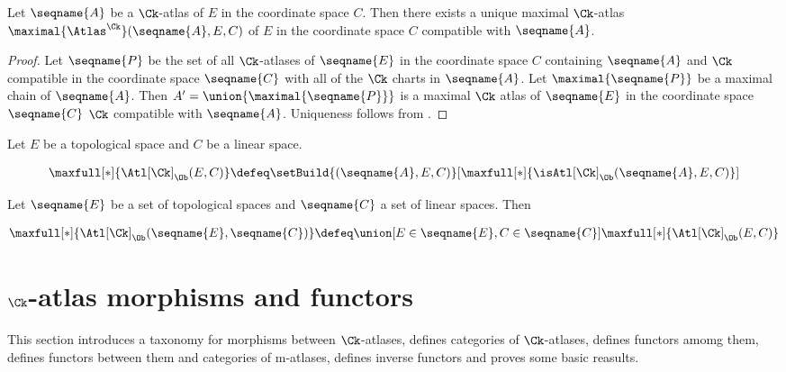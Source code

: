 \documentclass{article}
\begin{document}
\begin{theorem}
Let $\seqname{A}$ be a $\Ck$-atlas of $E$ in the coordinate space $C$.
Then there exists a unique maximal $\Ck$-atlas
$\maximal{\Atlas^\Ck}(\seqname{A}, E, C)$ of $E$ in the coordinate space $C$
compatible with $\seqname{A}$.

\begin{proof}
Let $\seqname{P}$ be the set of all $\Ck$-atlases of $\seqname{E}$ in
the coordinate space $C$ containing $\seqname{A}$ and $\Ck$ compatible
in the coordinate space $\seqname{C}$ with all of the $\Ck$ charts in
$\seqname{A}$. Let $\maximal{\seqname{P}}$ be a maximal chain of
$\seqname{A}$. Then $A'=\union{\maximal{\seqname{P}}}$ is a maximal
$\Ck$ atlas of $\seqname{E}$ in the coordinate space $\seqname{C}$
$\Ck$ compatible with $\seqname{A}$.
Uniqueness follows from .
\end{proof}
\end{theorem}

\begin{definition}
\label{def:Ck-ATLsets}

Let $E$ be a topological space and $C$ be a linear space.

\begin{multline}
\maxfull[*]{\Atl[\Ck]_\Ob(E, C)} \defeq
\setBuild
{{
   (\seqname{A}, E, C)
}}%
[
  {
    \maxfull[*]
    {
      \isAtl[\Ck]_\Ob
      (\seqname{A}, E, C)
    }
  }
]
\end{multline}

Let $\seqname{E}$ be a set of topological spaces and $\seqname{C}$ a
set of linear spaces. Then

\begin{multline}
\maxfull[*]{\Atl[\Ck]_\Ob (\seqname{E}, \seqname{C})} \defeq
  \union
    [
        {E \in \seqname{E}},
        {C \in \seqname{C}}
    ]
    {{
      \maxfull[*]{\Atl[\Ck]_\Ob(E, C)}
    }}
\end{multline}

\end{definition}

\section{$\Ck$-atlas morphisms and functors}
\label{sec:ckmorph}
This section introduces a taxonomy for morphisms between $\Ck$-atlases,
defines categories of $\Ck$-atlases, defines functors amomg them,
defines functors between them and categories of m-atlases, defines
inverse functors and proves some basic reasults.
\end{document}
